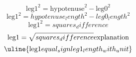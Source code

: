 \[\text{{{leg1}}}^{{2}}=\text{{{hypotenuse}}}^{{2}}-\text{{{leg0}}}^{{2}}\]
\[\text{{{leg1}}}^{{2}}={hypotenuse_length}^{{2}}-{leg0_length}^{{2}}\]
\[\text{{{leg1}}}^{{2}}={squares_difference}\]
\[\text{{{leg1}}}=\sqrt{{\mathstrut {squares_difference}}}\text{{{explanation}}}\]
\[\uline{{\text{{{leg1}}}{equal_sign}{leg1_length_with_unit}}}\]